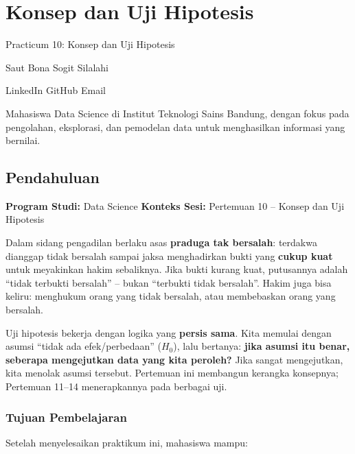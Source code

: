\documentclass[
  indonesian,
  letterpaper,
]{book}
\begin{document}

\chapter{Konsep dan Uji Hipotesis}\label{konsep-dan-uji-hipotesis}

Practicum 10: Konsep dan Uji Hipotesis

\hfill\break

Saut Bona Sogit Silalahi

LinkedIn {\textbar{}} GitHub {\textbar{}} Email

Mahasiswa Data Science di Institut Teknologi Sains Bandung, dengan fokus
pada pengolahan, eksplorasi, dan pemodelan data untuk menghasilkan
informasi yang bernilai.

\section{Pendahuluan}\label{pendahuluan}

\textbf{Program Studi:} Data Science \textbf{Konteks Sesi:} Pertemuan 10
-- Konsep dan Uji Hipotesis

Dalam sidang pengadilan berlaku asas \textbf{praduga tak bersalah}:
terdakwa dianggap tidak bersalah sampai jaksa menghadirkan bukti yang
\textbf{cukup kuat} untuk meyakinkan hakim sebaliknya. Jika bukti kurang
kuat, putusannya adalah ``tidak terbukti bersalah'' -- bukan ``terbukti
tidak bersalah''. Hakim juga bisa keliru: menghukum orang yang tidak
bersalah, atau membebaskan orang yang bersalah.

Uji hipotesis bekerja dengan logika yang \textbf{persis sama}. Kita
memulai dengan asumsi ``tidak ada efek/perbedaan'' (\(H_0\)), lalu
bertanya: \textbf{jika asumsi itu benar, seberapa mengejutkan data yang
kita peroleh?} Jika sangat mengejutkan, kita menolak asumsi tersebut.
Pertemuan ini membangun kerangka konsepnya; Pertemuan 11--14
menerapkannya pada berbagai uji.

\subsection{Tujuan Pembelajaran}\label{tujuan-pembelajaran}

Setelah menyelesaikan praktikum ini, mahasiswa mampu:
\end{document}
